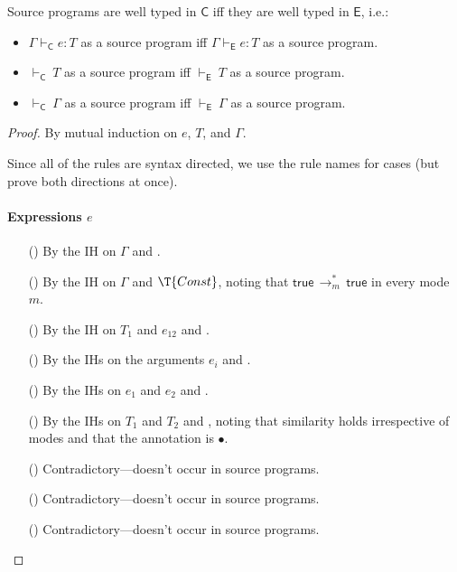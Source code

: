\documentclass[9pt]{extarticle}
\newcommand{\ottnt}[1]{\mathit{#1}}
\newcommand{\ottmv}[1]{\mathit{#1}}
\begin{document}
\begin{lemma}
  \label{lem:eideticsource}
  Source programs are well typed in $ \mathsf{C} $ iff they are well typed in
  $ \mathsf{E} $, i.e.:
\begin{itemize}
  \item $ \Gamma   \vdash _{  \mathsf{C}  }  \ottnt{e}  :  \ottnt{T} $ as a source program iff $ \Gamma   \vdash _{  \mathsf{E}  }  \ottnt{e}  :  \ottnt{T} $ as a source program.
  \item $ \mathord{  \vdash _{  \mathsf{C}  } }~ \ottnt{T} $ as a source program iff $ \mathord{  \vdash _{  \mathsf{E}  } }~ \ottnt{T} $ as a source program.
  \item $ \mathord{  \vdash _{  \mathsf{C}  } }~ \Gamma $ as a source program iff $ \mathord{  \vdash _{  \mathsf{E}  } }~ \Gamma $ as a source program.
  \end{itemize}
\begin{proof}
    By mutual induction on $\ottnt{e}$, $\ottnt{T}$, and $\Gamma$.
{\iffull
    Since all of the rules are syntax directed, we use the rule names
    for cases (but prove both directions at once).
\paragraph{Expressions $\ottnt{e}$}
    \begin{itemize}
    \item[(\T{Var})] By the IH on $\Gamma$ and .
    \item[(\T{Const})] By the IH on $\Gamma$ and $\T{Const}$, noting
      that $ \mathsf{true}  \,  \longrightarrow ^{*}_{ \ottnt{m} }  \,  \mathsf{true} $ in every mode $\ottnt{m}$.
    \item[(\T{Abs})] By the IH on $\ottnt{T_{{\mathrm{1}}}}$ and $\ottnt{e_{{\mathrm{12}}}}$ and .
    \item[(\T{Op})] By the IHs on the arguments $\ottnt{e_{\ottmv{i}}}$ and .
    \item[(\T{App})] By the IHs on $\ottnt{e_{{\mathrm{1}}}}$ and $\ottnt{e_{{\mathrm{2}}}}$ and .
    \item[(\T{Cast})] By the IHs on $\ottnt{T_{{\mathrm{1}}}}$ and $\ottnt{T_{{\mathrm{2}}}}$ and
      , noting that similarity holds irrespective of modes and
      that the annotation is $ \bullet $.
    \item[(\T{Blame})] Contradictory---doesn't occur in source programs.
    \item[(\T{Check})] Contradictory---doesn't occur in source programs.
    \item[(\T{Stack})] Contradictory---doesn't occur in source programs.
    \end{itemize}
    
}
\end{proof}
\end{lemma}
\end{document}
